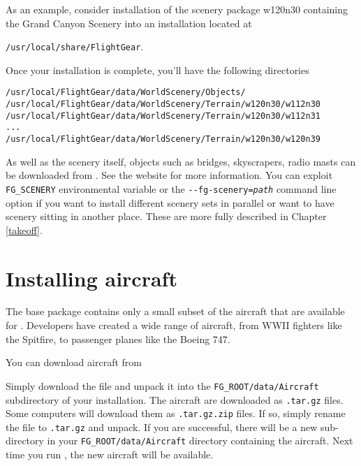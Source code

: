 As an example, consider installation of the scenery package w120n30 containing the Grand
Canyon Scenery into an installation located at 

\texttt{/usr/local/share/FlightGear}.

Once your installation is complete, you'll have the following directories
\medskip

\begin{verbatim}
/usr/local/FlightGear/data/WorldScenery/Objects/
/usr/local/FlightGear/data/WorldScenery/Terrain/w120n30/w112n30
/usr/local/FlightGear/data/WorldScenery/Terrain/w120n30/w112n31
...
/usr/local/FlightGear/data/WorldScenery/Terrain/w120n30/w120n39
\end{verbatim}
\medskip

As well as the scenery itself, objects such as bridges, skyscrapers, radio masts can be downloaded
from . See the website for more information.
\medskip
You can exploit \texttt{FG\_SCENERY} environmental variable or the \texttt{-$ $-fg-scenery={\it path}} command line option if you want to install different scenery sets in parallel or want to have scenery sitting in another place. These are more fully described in Chapter \ref{takeoff}.

\section{Installing aircraft}\label{install_aircraft}

The base \FlightGear{} package contains only a small subset of the aircraft that are available for \FlightGear{}. 
Developers have created a wide range of aircraft, from WWII fighters like the Spitfire, to passenger planes like the Boeing 747.

You can download aircraft from 

\medskip
{}
\medskip

Simply download the file and unpack it into the 
\texttt{FG\_ROOT/data/Aircraft} subdirectory of your installation. The 
aircraft are downloaded as \texttt{.tar.gz} files. Some computers will download
them as \texttt{.tar.gz.zip} files. If so, simply rename the file to 
\texttt{.tar.gz} and unpack. If you are successful, there will be a new 
sub-directory in your \texttt{FG\_ROOT/data/Aircraft} directory containing the
aircraft. Next time you run \FlightGear{}, the new aircraft will be available.
 
